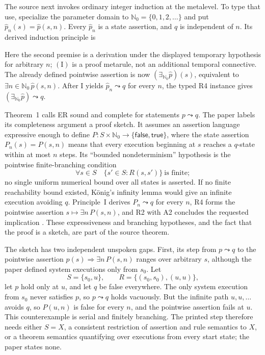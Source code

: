The source next invokes ordinary integer induction at the metalevel.  To type
that use, specialize the parameter domain to
\(\mathbb N_0=\{0,1,2,\ldots\}\) and put
\(\widehat p_n(s)=\widehat p(s,n)\).  Every \(\widehat p_n\) is a state assertion,
and \(q\) is independent of \(n\).  Its derived induction principle is
\par\noindent
\begin{minipage}{\linewidth}
\end{minipage}
\par
Here the second premise is a derivation under the displayed temporary
hypothesis for arbitrary \(n\); \((\mathrm I)\) is a proof metarule, not an
additional temporal connective.  The already defined pointwise assertion is
now \((\exists_{\mathbb N_0}\widehat p)(s)\), equivalent to
\(\exists n\in\mathbb N_0\,\widehat p(s,n)\).  After I yields
\(\widehat p_n\leadsto q\) for every \(n\), the typed R4 instance gives
\((\exists_{\mathbb N_0}\widehat p)\leadsto q\).

Theorem~1 calls ER sound and complete for statements
\(p\leadsto q\).  The paper labels its completeness argument a proof sketch.
It assumes an assertion language expressive enough to define
\(P:S\times\mathbb N_0\to\{\mathsf{false},\mathsf{true}\}\), where the state
assertion \(P_n(s)=P(s,n)\) means that every execution beginning at \(s\)
reaches a \(q\)-state within at most \(n\) steps.  Its ``bounded
nondeterminism'' hypothesis is the
pointwise finite-branching condition
\[
 \forall s\in S\quad
 \{s'\in S:R(s,s')\}\ \text{is finite};
\]
no single uniform numerical bound over all states is asserted.  If no finite
reachability bound existed, K\"onig's infinity lemma would give an infinite
execution avoiding \(q\).  Principle~I derives
\(P_n\leadsto q\) for every \(n\), R4 forms the pointwise assertion
\(s\mapsto\exists n\,P(s,n)\), and R2 with A2
concludes the requested implication
\cite[pp.~49--50]{Pnueli1977}.  These expressiveness and branching hypotheses,
and the fact that the proof is a sketch, are part of the source theorem.

The sketch has two independent unspoken gaps.  First, its step from
\(p\leadsto q\) to the pointwise assertion
\(p(s)\Rightarrow\exists n\,P(s,n)\) ranges over arbitrary \(s\), although the
paper defined system executions only from \(s_0\).  Let
\[
 S=\{s_0,u\},\qquad
 R=\{(s_0,s_0),(u,u)\},
\]
let \(p\) hold only at \(u\), and let \(q\) be false everywhere.  The only
system execution from \(s_0\) never satisfies \(p\), so \(p\leadsto q\) holds
vacuously.  But the infinite path \(u,u,\ldots\) avoids \(q\), so \(P(u,n)\)
is false for every \(n\), and the pointwise assertion fails at \(u\).  This
counterexample is serial and finitely branching.  The printed step therefore
needs either \(S=X\), a consistent restriction of assertion and rule semantics
to \(X\), or a theorem semantics quantifying over executions from every start
state; the paper states none.

